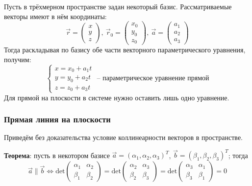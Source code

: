 \documentclass[12pt, a4paper, reqno]{article}
\begin{document}
    Пусть в трёхмерном пространстве задан некоторый базис. Рассматриваемые векторы имеют в нём
    координаты:
    \begin{equation*}
        \vec{r} =
        \begin{pmatrix}
            x \\ y \\ z
        \end{pmatrix},\
        \vec{r}_0 =
        \begin{pmatrix}
            x_0 \\ y_0 \\ z_0
        \end{pmatrix},\
        \vec{a} =
        \begin{pmatrix}
            a_1 \\ a_2 \\ a_3
        \end{pmatrix}
    \end{equation*}
    Тогда раскладывая по базису обе части векторного параметрического уравнения, получим:
    \begin{equation*}
        \boxed{\begin{cases}
            x = x_0 + a_1 t \\
            y = y_0 + a_2 t \\
            z = z_0 + a_3 t
        \end{cases}}\text{ -- параметрическое уравнение прямой}
    \end{equation*}
    Для прямой на плоскости в системе нужно оставить лишь одно уравнение.

    \subsubsection{Прямая линия на плоскости}

    Приведём без доказательства условие коллинеарности векторов в пространстве.

    \textbf{Теорема}: пусть в некотором базисе $\vec{a} = (\alpha_1, \alpha_2, \alpha_3)^T$,
    $\vec{b} = (\beta_1, \beta_2, \beta_3)^T$; тогда
    \begin{equation*}
        \vec{a} \parallel \vec{b} \iff
        \text{det}
        \begin{pmatrix}
            \alpha_1 & \alpha_2 \\
            \beta_1  & \beta_2
        \end{pmatrix} =
        \text{det}
        \begin{pmatrix}
            \alpha_2 & \alpha_3 \\
            \beta_2  & \beta_3
        \end{pmatrix} =
        \text{det}
        \begin{pmatrix}
            \alpha_3 & \alpha_1 \\
            \beta_3  & \beta_1
        \end{pmatrix} = 0
    \end{equation*}
\end{document}
